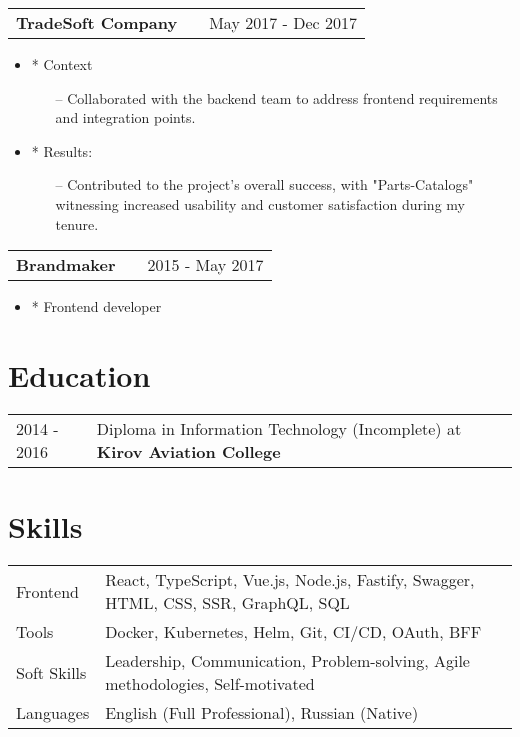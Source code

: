\documentclass[a4paper,12pt]{article}
\makeatletter
\newenvironment{joblong}[2]
    {
    \begin{tabularx}{\linewidth}{@{}l X r@{}}
    \textbf{#1} & \hfill &  #2 \\[3.75pt]
    \end{tabularx}
    \begin{minipage}[t]{\linewidth}
    \begin{itemize}[nosep,after=\strut, leftmargin=1em, itemsep=3pt,label=--]
    }
    {
    \end{itemize}
    \end{minipage}    
    }
\makeatother
\begin{document}
\begin{joblong}{TradeSoft Company}{May 2017 - Dec 2017}
  \item[*] Context
    \begin{itemize}
      \item [--] Collaborated with the backend team to address frontend requirements and integration points.
    \end{itemize}
  \item [*] Results:
    \begin{itemize}
      \item [--] Contributed to the project's overall success, with "Parts-Catalogs" witnessing increased usability and customer satisfaction during my tenure.
    \end{itemize}
\end{joblong}

\begin{joblong}{Brandmaker}{2015 - May 2017}
\item [*] Frontend developer
\end{joblong}

\section{Education}
\begin{tabularx}{\linewidth}{@{}l X@{}}	
2014 - 2016 & Diploma in Information Technology (Incomplete) at \textbf{Kirov Aviation College} \hfill \normalsize  \\
\end{tabularx}

\section{Skills}
\begin{tabularx}{\linewidth}{@{}l X@{}}
Frontend &  \normalsize{React, TypeScript, Vue.js, Node.js, Fastify, Swagger, HTML, CSS, SSR, GraphQL, SQL}\\
Tools  &  \normalsize{Docker, Kubernetes, Helm, Git, CI/CD, OAuth, BFF}\\  
Soft Skills  &  \normalsize{Leadership, Communication, Problem-solving, Agile methodologies, Self-motivated}\\  
\item [] Languages & \normalsize{English (Full Professional), Russian (Native)}\\  
\end{tabularx}

\vfill
{}
\end{document}
